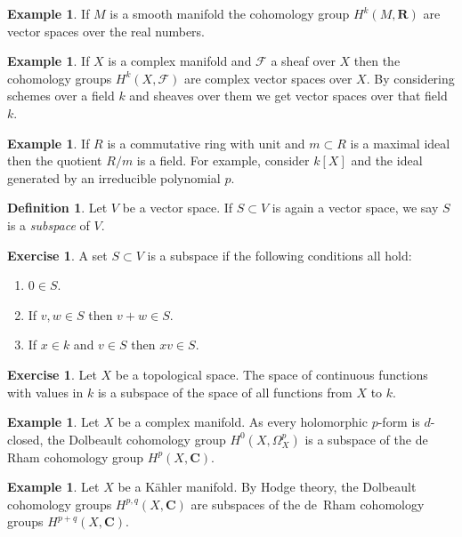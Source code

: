 \documentclass[11pt]{article}
\theoremstyle{definition}
\newtheorem{defi}[theo]{Definition}
\newtheorem{exam}[theo]{Example}
\newtheorem{exer}[theo]{Exercise}
\newcommand{\cc}[1]{\mathcal{#1}}
\def\CC{\mathbf{C}}
\def\RR{\mathbf{R}}
\begin{document}
\begin{exam}
If $M$ is a smooth manifold the cohomology group $H^k(M, \RR)$ are vector spaces over the real numbers.
\end{exam}

\begin{exam}
If $X$ is a complex manifold and $\cc F$ a sheaf over $X$ then the cohomology groups $H^k(X, \cc F)$ are complex vector spaces over $X$.
By considering schemes over a field $k$ and sheaves over them we get vector spaces over that field $k$.
\end{exam}

\begin{exam}
If $R$ is a commutative ring with unit and $m \subset R$ is a maximal ideal then the quotient $R/m$ is a field.
For example, consider $k[X]$ and the ideal generated by an irreducible polynomial $p$.
\end{exam}


\begin{defi}
Let $V$ be a vector space.
If $S \subset V$ is again a vector space, we say $S$ is a \emph{subspace} of $V$.
\end{defi}

\begin{exer}
A set $S \subset V$ is a subspace if the following conditions all hold:
\begin{enumerate}
\item
$0 \in S$.

\item
If $v,w \in S$ then $v + w \in S$.

\item
If $x \in k$ and $v \in S$ then $xv \in S$.
\end{enumerate}
\end{exer}


\begin{exer}
Let $X$ be a topological space.
The space of continuous functions with values in $k$ is a subspace of the space of all functions from $X$ to $k$.
\end{exer}

\begin{exam}
Let $X$ be a complex manifold.
As every holomorphic $p$-form is $d$-closed, the Dolbeault cohomology group $H^0(X, \Omega^p_X)$ is a subspace of the de Rham cohomology group $H^p(X,\CC)$.
\end{exam}

\begin{exam}
Let $X$ be a K\"ahler manifold.
By Hodge theory, the Dolbeault cohomology groups $H^{p,q}(X,\CC)$ are subspaces of the de~Rham cohomology groups $H^{p+q}(X,\CC)$.
\end{exam}
\end{document}
